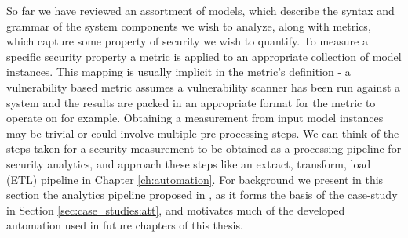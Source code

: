
So far we have reviewed an assortment of models, which describe the syntax and grammar of the system components we wish to analyze, along with metrics, which capture some property of security we wish to quantify. To measure a specific security property a metric is applied to an appropriate collection of model instances. This mapping is usually implicit in the metric's definition - a vulnerability based metric assumes a vulnerability scanner has been run against a system and the results are packed in an appropriate format for the metric to operate on for example. Obtaining a measurement from input model instances may be trivial or could involve multiple pre-processing steps. We can think of the steps taken for a security measurement to be obtained as a processing pipeline for security analytics, and approach these steps like an extract, transform, load (ETL) pipeline in Chapter \ref{ch:automation}. For background we present in this section the analytics pipeline proposed in \cite{Abraham_2016}, as it forms the basis of the case-study in Section \ref{sec:case_studies:att}, and motivates much of the developed automation used in future chapters of this thesis.

